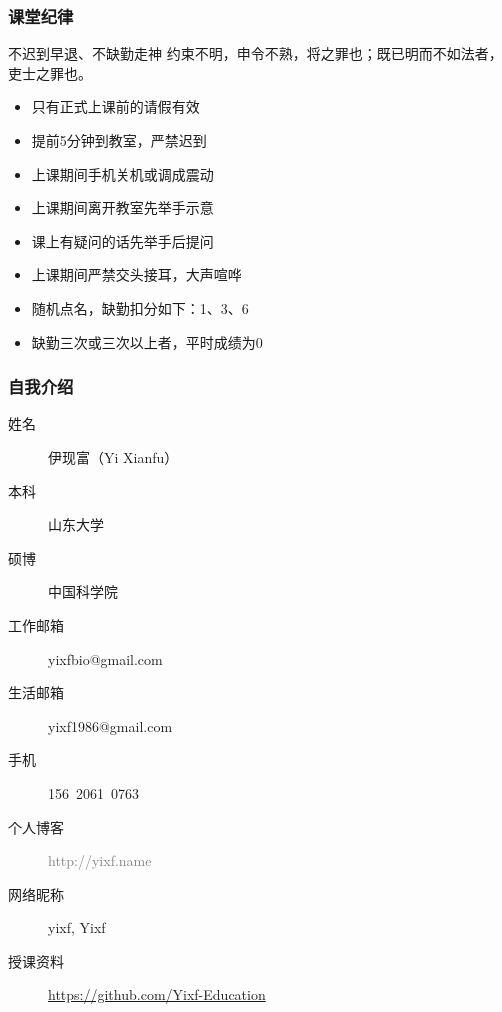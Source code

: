 



\begin{frame}
  \frametitle{课堂纪律}
  \begin{alertblock}{不迟到早退、不缺勤走神}
  约束不明，申令不熟，将之罪也；既已明而不如法者，吏士之罪也。
  \end{alertblock}
  \pause
  \begin{itemize}[<+->]
    \item 只有正式上课前的请假有效
    \item 提前5分钟到教室，严禁迟到
    \item 上课期间手机关机或调成震动
    \item 上课期间离开教室先举手示意
    \item 课上有疑问的话先举手后提问
    \item 上课期间严禁交头接耳，大声喧哗
    \item 随机点名，缺勤扣分如下：1、3、6
    \item 缺勤三次或三次以上者，平时成绩为0
  \end{itemize}
\end{frame}

\begin{frame}
  \frametitle{自我介绍}
    \begin{description}
      \item[姓\qquad 名]伊现富（Yi Xianfu）
      \item[本\qquad 科]山东大学
      \item[硕\qquad 博]中国科学院
      \item[工作邮箱]\alert{yixfbio@gmail.com}
      \item[生活邮箱]yixf1986@gmail.com
      \item[手\qquad 机]\alert{156\ 2061\ 0763}
      \item[个人博客]\textcolor{gray}{http://yixf.name}
      \item[网络昵称]yixf, Yixf
      \item[授课资料]\alert{\href{https://github.com/Yixf-Education}{https://github.com/Yixf-Education}}
    \end{description}
\end{frame}

